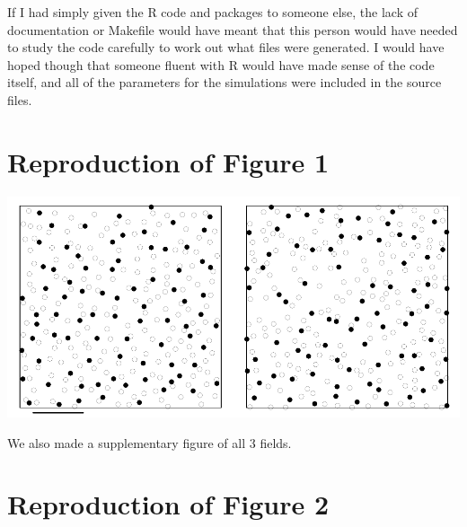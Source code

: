 If I had simply given the R code and packages to someone else, the lack
of documentation or Makefile would have meant that this person would
have needed to study the code carefully to work out what files were
generated. I would have hoped though that someone fluent with R would
have made sense of the code itself, and all of the parameters for the
simulations were included in the source files.

\section{Reproduction of Figure 1}

\includegraphics[width=\textwidth]{../hor_fieldA_col.pdf}

We also made a supplementary figure of all 3 fields.

\section{Reproduction of Figure 2}

